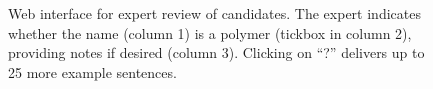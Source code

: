 \begin{figure}
\centering
{}
\caption{\label{fig:polyner} Web interface for expert review of candidates.
The expert indicates whether the name (column 1) is a polymer (tickbox in column 2), 
providing notes if desired (column 3). 
Clicking on ``?'' delivers up to 25 more example sentences.
}
\end{figure}






